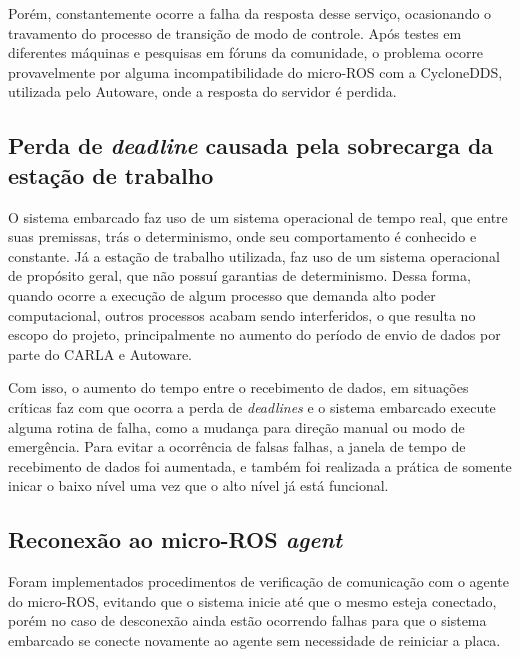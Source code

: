 Porém, constantemente ocorre a falha da resposta desse serviço, ocasionando o travamento do processo de transição de modo de controle. Após testes em diferentes máquinas e pesquisas em fóruns da comunidade, o problema ocorre provavelmente por alguma incompatibilidade do micro-ROS com a CycloneDDS, utilizada pelo Autoware, onde a resposta do servidor é perdida.


\subsection*{Perda de \textit{deadline} causada pela sobrecarga da estação de trabalho}

O sistema embarcado faz uso de um sistema operacional de tempo real, que entre suas premissas, trás o determinismo, onde seu comportamento é conhecido e constante. Já a estação de trabalho utilizada, faz uso de um sistema operacional de propósito geral, que não possuí garantias de determinismo. Dessa forma, quando ocorre a execução de algum processo que demanda alto poder computacional, outros processos acabam sendo interferidos, o que resulta no escopo do projeto, principalmente no aumento do período de envio de dados por parte do CARLA e Autoware.

Com isso, o aumento do tempo entre o recebimento de dados, em situações críticas faz com que ocorra a perda de \textit{deadlines} e o sistema embarcado execute alguma rotina de falha, como a mudança para direção manual ou modo de emergência. Para evitar a ocorrência de falsas falhas, a janela de tempo de recebimento de dados foi aumentada, e também foi realizada a prática de somente inicar o baixo nível uma vez que o alto nível já está funcional.


\subsection*{Reconexão ao micro-ROS \textit{agent}}

Foram implementados procedimentos de verificação de comunicação com o agente do micro-ROS, evitando que o sistema inicie até que o mesmo esteja conectado, porém no caso de desconexão ainda estão ocorrendo falhas para que o sistema embarcado se conecte novamente ao agente sem necessidade de reiniciar a placa.




\clearpage